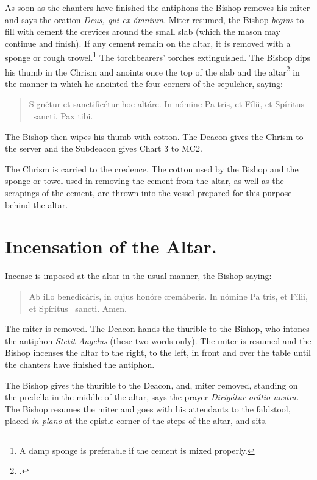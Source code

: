 \documentclass[letterpaper]{report}
\newcommand\blessincense{
\begin{quote}
   Ab illo benedicáris, in cujus honóre cremáberis. In nómine Pa\cross
    tris, et Fí\cross lii, et Spíritus \cross\ sancti. \rbar Amen.
\end{quote}
}
\begin{document}
{    \rubric As soon as the chanters have finished the antiphons the Bishop
    removes his miter and says the oration \textit{Deus, qui ex ómnium.} Miter
    resumed, the Bishop \textit{begins} to fill with cement the crevices around
    the small slab (which the mason may continue and finish). If any cement
    remain on the altar, it is removed with a sponge or rough
    trowel.\footnote{A damp sponge is preferable if the cement is mixed
    properly.} The torchbearers' torches extinguished. The Bishop dips his
    thumb in the Chrism and anoints once the top of the slab and the
    altar\footcite[Martinucci, Hartmann, Moretti, etc., say that the cross
    should be made not only on the slab, but also on the portions of the table
    of the altar near the slab.][footnote 1, p. 90.]{consecranda} in the manner
    in which he anointed the four corners of the sepulcher, saying:

    \begin{quote}
        Signé\cross tur et sancti\cross ficétur hoc altáre. In nómine Pa\cross
        tris, et Fí\cross lii, et Spíritus \cross\ sancti. Pax tibi.
    \end{quote}

    The Bishop then wipes his thumb with cotton. The Deacon gives the Chrism to the
    server and the Subdeacon gives Chart 3 to MC2.

    The Chrism is carried to the credence. The cotton used by the Bishop and
    the sponge or towel used in removing the cement from the altar, as well as
    the scrapings of the cement, are thrown into the vessel prepared for this
    purpose behind the altar.

    \section{Incensation of the Altar.}

    \rubric Incense is imposed at the altar in the usual manner, the Bishop
    saying:

    \blessincense

    The miter is removed. The Deacon hands the thurible to the Bishop, who
    intones the antiphon \textit{Stetit Angelus} (these two words only). The
    miter is resumed and the Bishop incenses the altar to the right, to the
    left, in front and over the table until the chanters have finished the
    antiphon.

    \rubric The Bishop gives the thurible to the Deacon, and, miter removed,
    standing on the predella in the middle of the altar, says the prayer
    \textit{Dirigátur orátio nostra.} The Bishop resumes the miter and goes
    with his attendants to the faldstool, placed \textit{in plano} at the
    epistle corner of the steps of the altar, and sits.

}
\end{document}
